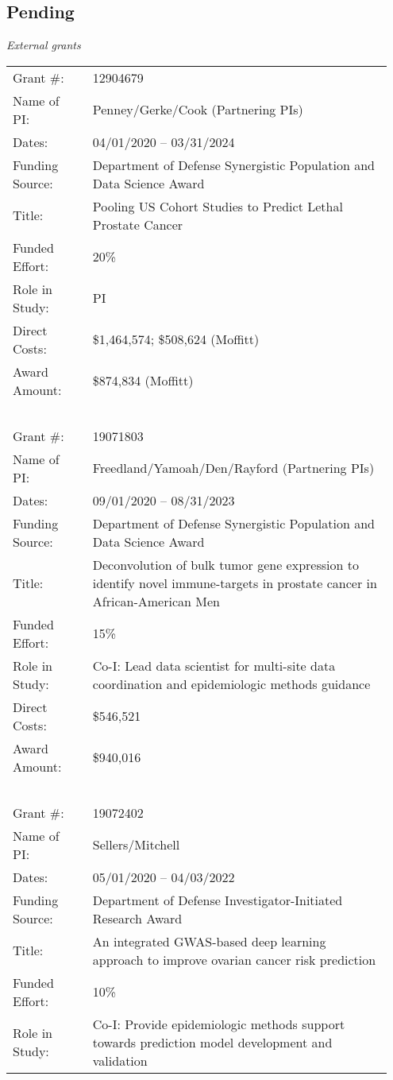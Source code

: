 \documentclass[11pt, a4paper]{article} %
\begin{document}
\subsection*{Pending}
\emph{External grants}
\begin{longtable}{@{}p{0.2\linewidth} p{0.75\linewidth}}
Grant \#: & 12904679\\
Name of PI: & Penney/Gerke/Cook (Partnering PIs)\\
Dates: & 04/01/2020 -- 03/31/2024\\
Funding Source: & Department of Defense Synergistic Population and Data Science Award\\
Title: & Pooling US Cohort Studies to Predict Lethal Prostate Cancer\\
Funded Effort: & 20\%\\
Role in Study: & PI \\
Direct Costs: & \$1,464,574; \$508,624 (Moffitt)\\
Award Amount: & \$874,834 (Moffitt)\\
~\\
Grant \#: & 19071803\\
Name of PI: & Freedland/Yamoah/Den/Rayford (Partnering PIs)\\
Dates: & 09/01/2020 -- 08/31/2023\\
Funding Source: & Department of Defense Synergistic Population and Data Science Award\\
Title: & Deconvolution of bulk tumor gene expression to identify novel immune-targets in prostate cancer in African-American Men\\
Funded Effort: & 15\%\\
Role in Study: & Co-I: Lead data scientist for multi-site data coordination and epidemiologic methods guidance\\
Direct Costs: & \$546,521\\
Award Amount: & \$940,016\\
~\\
Grant \#: & 19072402\\
Name of PI: & Sellers/Mitchell\\
Dates: & 05/01/2020 -- 04/03/2022\\
Funding Source: & Department of Defense Investigator-Initiated Research Award\\
Title: & An integrated GWAS-based deep learning approach to improve ovarian cancer risk prediction\\
Funded Effort: & 10\%\\
Role in Study: & Co-I: Provide epidemiologic methods support towards prediction model development and validation\\

\end{longtable}
\end{document}
